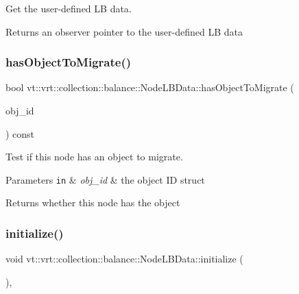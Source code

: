 Get the user-\/defined LB data. 

\begin{DoxyReturn}{Returns}
an observer pointer to the user-\/defined LB data 
\end{DoxyReturn}
\mbox{\label{structvt_1_1vrt_1_1collection_1_1balance_1_1_node_l_b_data_af025247a42d9b3ff6ba476714aad42fa}} 
\subsubsection{\texorpdfstring{has\+Object\+To\+Migrate()}{hasObjectToMigrate()}}
{\footnotesize\ttfamily bool vt\+::vrt\+::collection\+::balance\+::\+Node\+L\+B\+Data\+::has\+Object\+To\+Migrate (\begin{DoxyParamCaption}\item[{\hyperlink{namespacevt_1_1vrt_1_1collection_1_1balance_a9f5b53fafb270212279a4757d2c4cd28}{Element\+I\+D\+Struct}}]{obj\+\_\+id }\end{DoxyParamCaption}) const}



Test if this node has an object to migrate. 


\begin{DoxyParams}[1]{Parameters}
\mbox{\tt in}  & {\em obj\+\_\+id} & the object ID struct\\
\hline
\end{DoxyParams}
\begin{DoxyReturn}{Returns}
whether this node has the object 
\end{DoxyReturn}
\mbox{\label{structvt_1_1vrt_1_1collection_1_1balance_1_1_node_l_b_data_aa489e1252abac8237d30bb0110ad36f9}} 
\subsubsection{\texorpdfstring{initialize()}{initialize()}}
{\footnotesize\ttfamily void vt\+::vrt\+::collection\+::balance\+::\+Node\+L\+B\+Data\+::initialize (\begin{DoxyParamCaption}{ }\end{DoxyParamCaption})\hspace{0.3cm}{\ttfamily [override]}, {\ttfamily [virtual]}}



